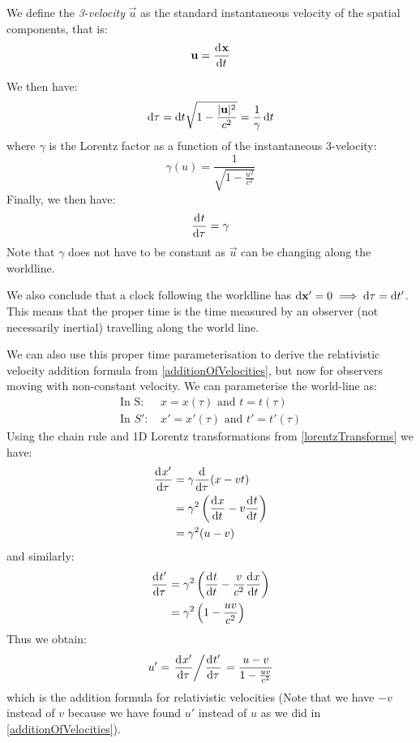 \documentclass[../main.tex]{subfiles}
\begin{document}
\begin{definition}[3-Velocity]
  We define the \textit{3-velocity} $\vec{u}$ as the standard instantaneous velocity of the spatial components, that is:
  \[
    \vec{u} = \deriv{\vec{x}}{t}
  \]
\end{definition}
We then have:
\[
  \d{\tau} = \d{t}\sqrt{1 - \frac{|\vec{u}|^2}{c^2}} = \frac{1}{\gamma}\d{t}
\]
where $\gamma$ is the Lorentz factor as a function of the instantaneous 3-velocity:
\[
  \gamma(u) = \frac{1}{\sqrt{1 - \frac{u^2}{c^2}}}
\]
Finally, we then have:
\begin{equation}
  \deriv{t}{\tau} = \gamma \label{dvttau}
\end{equation}
Note that $\gamma$ does not have to be constant as $\vec{u}$ can be changing along the worldline.

We also conclude that a clock following the worldline has $\d{\vec{x}'} = 0 \implies \d{\tau} = \d{t'}$.
This means that the proper time is the time measured by an observer (not necessarily inertial) travelling along the world line.

We can also use this proper time parameterisation to derive the relativistic velocity addition formula from \cref{additionOfVelocities}, but now for observers moving with non-constant velocity.
We can parameterise the world-line as:
\begin{align*}
  \text{In S: }& x = x(\tau) \text{ and } t = t(\tau) \\
  \text{In $S'$: }& x' = x'(\tau) \text{ and } t' = t'(\tau)
\end{align*}
Using the chain rule and 1D Lorentz transformations from \cref{lorentzTransforms} we have:
\begin{align*}
  \deriv{x'}{\tau} &= \gamma \deriv{}{\tau}(x - vt) \\
                   &= \gamma^2 \left(\deriv{x}{t} - v \deriv{t}{t}\right) \\
                   &= \gamma^2 (u - v)
\end{align*}
and similarly:
\begin{align*}
  \deriv{t'}{\tau} &= \gamma^2 \left(\deriv{t}{t} - \frac{v}{c^2} \deriv{x}{t}\right) \\
                   &= \gamma^2 \left(1 - \frac{uv}{c^2}\right)
\end{align*}
Thus we obtain:
\[
  u' = \left. \deriv{x'}{\tau} \middle/ \deriv{t'}{\tau} \right. = \frac{u - v}{1 - \frac{uv}{c^2}}
\]
which is the addition formula for relativistic velocities (Note that we have $-v$ instead of $v$ because we have found $u'$ instead of $u$ as we did in \cref{additionOfVelocities}).
\end{document}
